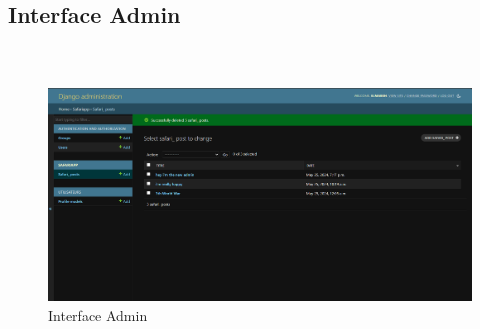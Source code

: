\begin{enumerate}
\section{Interface Admin}

\renewcommand{\thefigure}{10}
  \paragraph{\\}
\begin{center}
    \begin{figure}[htbp]
        \centering
        \includegraphics[width=1\linewidth, height=0.65\textheight]{images/Admin_Fourth.png} 
        \caption{Interface Admin}
        \label{fig:Interface Admin}
    \end{figure}
\end{center}
  
\end{enumerate}